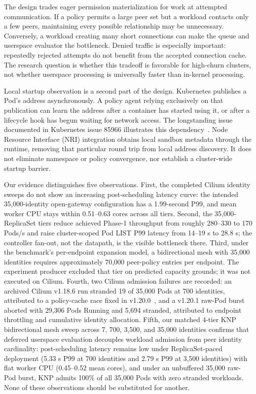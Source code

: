 \documentclass[letterpaper,twocolumn,10pt]{article}
\newcommand{\sys}{\textsc{KNP}}
\begin{document}
The design trades eager permission materialization for work at attempted
communication. If a policy permits a large peer set but a workload contacts
only a few peers, maintaining every possible relationship may be unnecessary.
Conversely, a workload creating many short connections can make the queue
and userspace evaluator the bottleneck. Denied traffic is especially
important: repeatedly rejected attempts do not benefit from the accepted
connection cache. The research question is whether this tradeoff is favorable
for high-churn clusters, not whether userspace processing is universally
faster than in-kernel processing.

Local startup observation is a second part of the design. Kubernetes
publishes a Pod's address asynchronously. A policy agent relying exclusively
on that publication can learn the address after a container has started
using it, or after a lifecycle hook has begun waiting for network access.
The longstanding issue documented in Kubernetes issue 85966 illustrates
this dependency~\cite{k8s85966}. Node Resource Interface (NRI) integration
obtains local sandbox metadata through the runtime, removing that particular
round trip from local address discovery. It does not eliminate namespace
or policy convergence, nor establish a cluster-wide startup barrier.

Our evidence distinguishes five observations. First, the completed
Cilium identity sweeps do not show an increasing post-scheduling latency
curve: the intended 35,000-identity open-gateway configuration has a
1.99-second P99, and mean worker CPU stays within 0.51--0.63 cores across
all tiers. Second, the 35,000-ReplicaSet tiers reduce achieved Phase-1
throughput from roughly 280--330 to 170 Pods/s and raise cluster-scoped
Pod LIST P99 latency from 14--19 s to 28.8 s; the controller fan-out, not
the datapath, is the visible bottleneck there. Third, under the benchmark's
per-endpoint expansion model, a bidirectional mesh with 35,000 identities
requires approximately 70,000 peer-policy entries per endpoint. The
experiment producer excluded that tier on predicted capacity grounds; it was
not executed on Cilium. Fourth, two Cilium admission failures are recorded: an archived
Cilium v1.18.6 run stranded 19 of 35,000 Pods at 700 identities, attributed
to a policy-cache race fixed in v1.20.0~\cite{cilium7515}, and a
v1.20.1 raw-Pod burst aborted with 29,306 Pods Running and 5,694 stranded,
attributed to endpoint throttling and cumulative identity allocation.
Fifth, our matched 4-tier \sys{} bidirectional mesh sweep across 7, 700,
3,500, and 35,000 identities confirms that deferred userspace evaluation
decouples workload admission from peer identity cardinality: post-scheduling
latency remains low under ReplicaSet-paced deployment (5.33 s P99 at 700
identities and 2.79 s P99 at 3,500 identities) with flat worker CPU
(0.45--0.52 mean cores), and under an unbuffered 35,000 raw-Pod burst, \sys{}
admits 100\% of all 35,000 Pods with zero stranded workloads. None
of these observations should be substituted for another.
\end{document}
